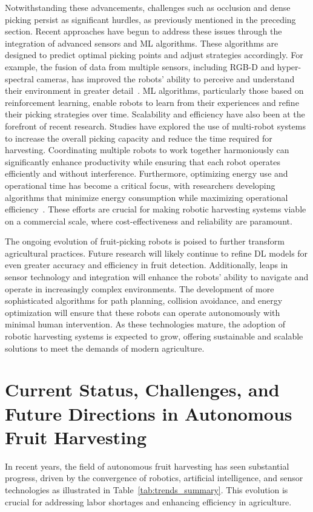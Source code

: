 \documentclass[a4paper,fleqn]{cas-dc}
\begin{document}
Notwithstanding these advancements, challenges such as occlusion and dense picking persist as significant hurdles, as previously mentioned in the preceding section. Recent approaches have begun to address these issues through the integration of advanced sensors and ML algorithms. These algorithms are designed to predict optimal picking points and adjust strategies accordingly. For example, the fusion of data from multiple sensors, including RGB-D and hyper-spectral cameras, has improved the robots' ability to perceive and understand their environment in greater detail~\cite{gene2019fruit, pourdarbani2020automatic}. ML algorithms, particularly those based on reinforcement learning, enable robots to learn from their experiences and refine their picking strategies over time.
Scalability and efficiency have also been at the forefront of recent research. Studies have explored the use of multi-robot systems to increase the overall picking capacity and reduce the time required for harvesting. Coordinating multiple robots to work together harmoniously can significantly enhance productivity while ensuring that each robot operates efficiently and without interference. Furthermore, optimizing energy use and operational time has become a critical focus, with researchers developing algorithms that minimize energy consumption while maximizing operational efficiency~\cite{rayhana2020internet, martos2021ensuring}. These efforts are crucial for making robotic harvesting systems viable on a commercial scale, where cost-effectiveness and reliability are paramount.

The ongoing evolution of fruit-picking robots is poised to further transform agricultural practices. Future research will likely continue to refine DL models for even greater accuracy and efficiency in fruit detection. Additionally, leaps in sensor technology and integration will enhance the robots' ability to navigate and operate in increasingly complex environments. The development of more sophisticated algorithms for path planning, collision avoidance, and energy optimization will ensure that these robots can operate autonomously with minimal human intervention. As these technologies mature, the adoption of robotic harvesting systems is expected to grow, offering sustainable and scalable solutions to meet the demands of modern agriculture.
\fi

\section{Current Status, Challenges, and Future Directions in Autonomous Fruit Harvesting}
In recent years, the field of autonomous fruit harvesting has seen substantial progress, driven by the convergence of robotics, artificial intelligence, and sensor technologies as illustrated in Table~\ref{tab:trends_summary}. This evolution is crucial for addressing labor shortages and enhancing efficiency in agriculture.
\end{document}
